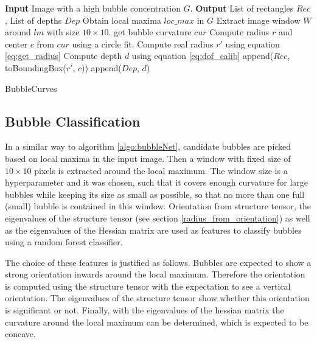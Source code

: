 		\begin{algorithm}
			\begin{algorithmic}[1]
				\State \textbf{Input} Image with a high bubble concentration $G$. 
				\State \textbf{Output} List of rectangles $Rec$, List of depths $Dep$
				\State Obtain local maxima $loc\_max$ in $G$
					\State Extract image window $W$ around $lm$ with size $10 \times 10$.
						\State get bubble curvature $cur$ 
						\State Compute radius $r$ and center $c$ from $cur$ using a circle fit.
						\State Compute real radius $r'$ using equation \ref{eq:get_radius}
						\State Compute depth $d$ using equation \ref{eq:dof_calib}
						\State append($Rec$, toBoundingBox($r'$, $c$))
						\State append($Dep$, $d$)
					\EndIf
				\EndFor
			\end{algorithmic}
			
			\caption{BubbleCurves}
			\label{algo:bubbleCurves}
		\end{algorithm}
	
	
	
	
	
	
	\subsection{Bubble Classification}\label{bubble_classification}
		In a similar way to algorithm \ref{algo:bubbleNet}, candidate bubbles are picked based on local maxima in the input image. Then a window with fixed size of $10 \times 10$ pixels is extracted around the local maximum. The window size is a hyperparameter and it was chosen, such that it covers enough curvature for large bubbles while keeping its size as small as possible, so that no more than one full (small) bubble is contained in this window. 
		 Orientation from structure tensor, the eigenvalues of the structure tensor (see section \ref{radius_from_orientation}) as well as the eigenvalues of the Hessian matrix are used as features to classify bubbles using a random forest classifier. 
		
		The choice of these features is justified as follows. Bubbles are expected to show a strong orientation inwards around the local maximum. Therefore the orientation is computed using the structure tensor with the expectation to see a vertical orientation. The eigenvalues of the structure tensor show whether this orientation is significant or not. Finally, with the eigenvalues of the hessian matrix the curvature around the local maximum can be determined, which is expected to be concave. 
		
